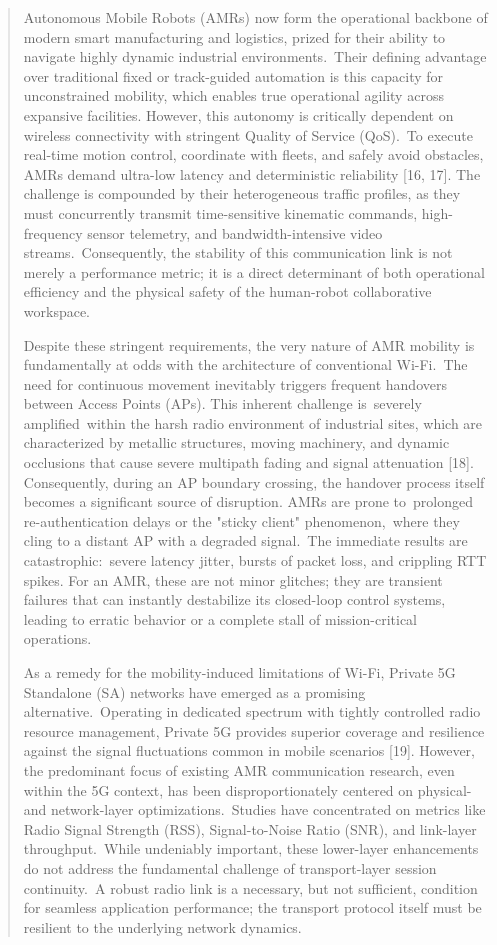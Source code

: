\begin{quote}
Autonomous Mobile Robots (AMRs) now form the operational backbone of modern smart manufacturing and logistics, prized for their ability to navigate highly dynamic industrial environments.~Their defining advantage over traditional fixed or track-guided automation is this capacity for unconstrained mobility, which enables true operational agility across expansive facilities. However, this autonomy is critically dependent on wireless connectivity with stringent Quality of Service (QoS).~To execute real-time motion control, coordinate with fleets, and safely avoid obstacles, AMRs demand ultra-low latency and deterministic reliability {[}16, 17{]}. The challenge is compounded by their heterogeneous traffic profiles, as they must concurrently transmit time-sensitive kinematic commands, high-frequency sensor telemetry, and bandwidth-intensive video streams.~Consequently, the stability of this communication link is not merely a performance metric; it is a direct determinant of both operational efficiency and the physical safety of the human-robot collaborative workspace.

Despite these stringent requirements, the very nature of AMR mobility is fundamentally at odds with the architecture of conventional Wi-Fi.~The need for continuous movement inevitably triggers frequent handovers between Access Points (APs). This inherent challenge is~severely amplified~within the harsh radio environment of industrial sites, which are characterized by metallic structures, moving machinery, and dynamic occlusions that cause severe multipath fading and signal attenuation {[}18{]}. Consequently, during an AP boundary crossing, the handover process itself becomes a significant source of disruption. AMRs are prone to~prolonged re-authentication delays or the "sticky client" phenomenon,~where they cling to a distant AP with a degraded signal.~The immediate results are catastrophic:~severe latency jitter, bursts of packet loss, and crippling RTT spikes. For an AMR, these are not minor glitches; they are transient failures that can instantly destabilize its closed-loop control systems, leading to erratic behavior or a complete stall of mission-critical operations.

As a remedy for the mobility-induced limitations of Wi-Fi, Private 5G Standalone (SA) networks have emerged as a promising alternative.~Operating in dedicated spectrum with tightly controlled radio resource management, Private 5G provides superior coverage and resilience against the signal fluctuations common in mobile scenarios {[}19{]}. However, the predominant focus of existing AMR communication research, even within the 5G context, has been disproportionately centered on physical- and network-layer optimizations.~Studies have concentrated on metrics like Radio Signal Strength (RSS), Signal-to-Noise Ratio (SNR), and link-layer throughput.~While undeniably important, these lower-layer enhancements do not address the fundamental challenge of transport-layer session continuity.~A robust radio link is a necessary, but not sufficient, condition for seamless application performance; the transport protocol itself must be resilient to the underlying network dynamics.


\end{quote}
